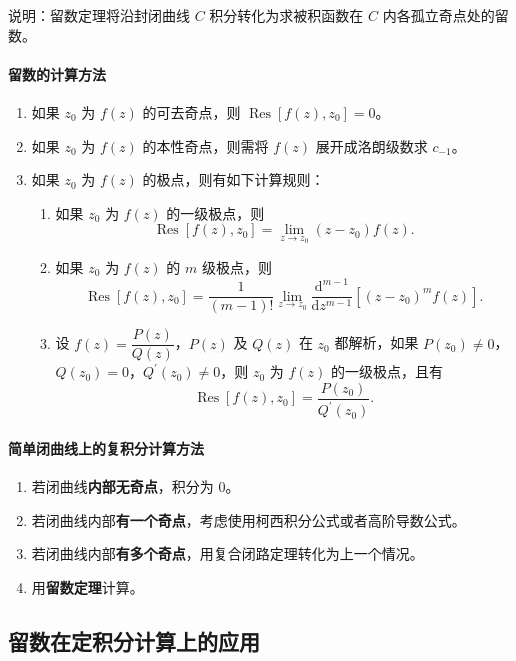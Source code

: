 说明：留数定理将沿封闭曲线 \(C\) 积分转化为求被积函数在 \(C\)
内各孤立奇点处的留数。
\paragraph{留数的计算方法}
\label{留数的计算方法}
\begin{enumerate}
\item 如果 \(z_{0}\) 为 \(f(z)\) 的可去奇点，则
\(\operatorname{Res}\left[f(z),z_{0}\right]=0\)。
\item 如果 \(z_{0}\) 为 \(f(z)\) 的本性奇点，则需将 \(f(z)\)
展开成洛朗级数求 \(c_{-1}\)。
\item 如果 \(z_{0}\) 为 \(f(z)\) 的极点，则有如下计算规则：
\begin{enumerate}
\item 如果 \(z_{0}\) 为 \(f(z)\) 的一级极点，则
\[
      \operatorname{Res}\left[f(z),z_{0}\right]=\lim _{z\rightarrow z_{0}}\left(z-z_{0}\right) f(z).
      \]
\item 如果 \(z_{0}\) 为 \(f(z)\) 的 \(m\) 级极点，则
\[
      \operatorname{Res}\left[f(z),z_{0}\right]=\frac{1}{(m-1)!}\lim_{z\to z_{0}}\frac{\mathrm{d}^{m-1}}{\mathrm{d}z^{m-1}}\left[(z-z_{0})^{m}f(z)\right].
      \]
\item 设 \(f(z)=\dfrac{P(z)}{Q(z)}\)，\(P(z)\) 及 \(Q(z)\) 在 \(z_{0}\)
都解析，如果
\(P(z_{0})\neq 0\)，\(Q(z_{0})=0\)，\(Q^{\prime}(z_{0})\neq 0\)，则
\(z_{0}\) 为 \(f(z)\) 的一级极点，且有
\[
      \operatorname{Res}[f(z),z_{0}]=\dfrac{P(z_{0})}{Q^{\prime}(z_{0})}.
      \]
\end{enumerate}
\end{enumerate}
\paragraph{简单闭曲线上的复积分计算方法}
\label{简单闭曲线上的复积分计算方法}
\begin{enumerate}
\item 若闭曲线\textbf{内部无奇点}，积分为 \(0\)。
\item 若闭曲线内部\textbf{有一个奇点}，考虑使用柯西积分公式或者高阶导数公式。
\item 若闭曲线内部\textbf{有多个奇点}，用复合闭路定理转化为上一个情况。
\item 用\textbf{留数定理}计算。
\end{enumerate}
\subsection{留数在定积分计算上的应用}
\label{留数在定积分计算上的应用}
